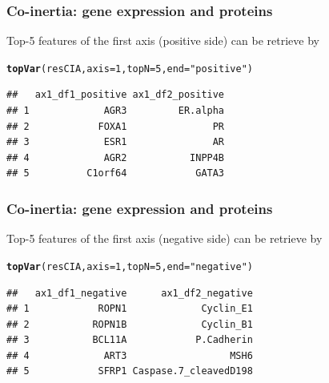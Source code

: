 \documentclass[10pt,xcolor=dvipsnames]{beamer}\usepackage[]{graphicx}\usepackage[]{color}
\makeatletter
\newcommand{\hlnum}[1]{\textcolor[rgb]{0.686,0.059,0.569}{#1}}%
\newcommand{\hlstr}[1]{\textcolor[rgb]{0.192,0.494,0.8}{#1}}%
\newcommand{\hlstd}[1]{\textcolor[rgb]{0.345,0.345,0.345}{#1}}%
\newcommand{\hlkwc}[1]{\textcolor[rgb]{0.333,0.667,0.333}{#1}}%
\newcommand{\hlkwd}[1]{\textcolor[rgb]{0.737,0.353,0.396}{\textbf{#1}}}%
\newenvironment{kframe}{%
 \def\at@end@of@kframe{}%
 \ifinner\ifhmode%
  \def\at@end@of@kframe{\end{minipage}}%
  \begin{minipage}{\columnwidth}%
 \fi\fi%
 \def\FrameCommand##1{\hskip\@totalleftmargin \hskip-\fboxsep
 \colorbox{shadecolor}{##1}\hskip-\fboxsep
     \hskip-\linewidth \hskip-\@totalleftmargin \hskip\columnwidth}%
 \MakeFramed {\advance\hsize-\width
   \@totalleftmargin\z@ \linewidth\hsize
   \@setminipage}}%
 {\par\unskip\endMakeFramed%
 \at@end@of@kframe}
\newenvironment{knitrout}{}{} %
\makeatother
\begin{document}
\begin{frame}[fragile]\frametitle{Co-inertia: gene expression and proteins}

Top-5 features of the first axis (positive side) can be retrieve by

\footnotesize 
\begin{knitrout}\footnotesize
{}\color{fgcolor}\begin{kframe}
\begin{alltt}
\hlkwd{topVar}\hlstd{(resCIA,} \hlkwc{axis}\hlstd{=}\hlnum{1}\hlstd{,} \hlkwc{topN}\hlstd{=}\hlnum{5}\hlstd{,} \hlkwc{end}\hlstd{=}\hlstr{"positive"}\hlstd{)}
\end{alltt}
\begin{verbatim}
##   ax1_df1_positive ax1_df2_positive
## 1             AGR3         ER.alpha
## 2            FOXA1               PR
## 3             ESR1               AR
## 4             AGR2           INPP4B
## 5          C1orf64            GATA3
\end{verbatim}
\end{kframe}
\end{knitrout}

\end{frame}



\begin{frame}[fragile]\frametitle{Co-inertia: gene expression and proteins}

Top-5 features of the first axis (negative side) can be retrieve by

\footnotesize 
\begin{knitrout}\footnotesize
{}\color{fgcolor}\begin{kframe}
\begin{alltt}
\hlkwd{topVar}\hlstd{(resCIA,} \hlkwc{axis}\hlstd{=}\hlnum{1}\hlstd{,} \hlkwc{topN}\hlstd{=}\hlnum{5}\hlstd{,} \hlkwc{end}\hlstd{=}\hlstr{"negative"}\hlstd{)}
\end{alltt}
\begin{verbatim}
##   ax1_df1_negative      ax1_df2_negative
## 1            ROPN1             Cyclin_E1
## 2           ROPN1B             Cyclin_B1
## 3           BCL11A            P.Cadherin
## 4             ART3                  MSH6
## 5            SFRP1 Caspase.7_cleavedD198
\end{verbatim}
\end{kframe}
\end{knitrout}

\end{frame}
\end{document}
